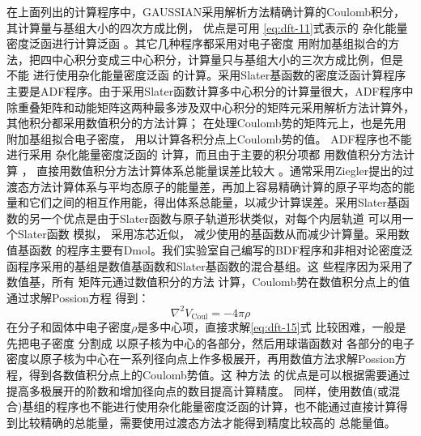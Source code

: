 在上面列出的计算程序中，GAUSSIAN采用解析方法精确计算的Coulomb积分，其计算量与基组大小的四次方成比例，%
{优点是可}用%
\eqref{eq:dft-11}式表示的%
{杂化能量密度泛函进行计算}泛函%
。其它几种程序都采用对电子密度%
用附加基组拟合{的方法}，把四中心积分变成三中心积分，计算量只与基组大小的三次方成比例，但是%
不能%
{进行}{使用杂化能量密度}泛函%
{的计算}。采用Slater基函数的密度泛函计算程序主要是ADF程序\cite{ADF-UG_1995}{。}由于采用Slater函数计算多中心积分的计算量很大，ADF程序中除重叠矩阵和动能矩阵这两种最多涉及双中心积分的矩阵元采用解析方法计算外，其他积分都采用数值积分的方法计算{；}%
在处理Coulomb势的矩阵元上，也是先用%
附加基组拟合电子密度，%
{用以}计算各积分点上Coulomb势的值。%
{ADF程序}也不能{进行}采用%
{杂化能量密度}泛函的%
{计算}，而且由于主要的积分项都%
用数值积分方法计算%
，%
直接用数值积分方法计算体系总能量{误差}比较大%
{。}通常采用Ziegler\cite{TCA46-1_1977}提出的过渡态方法计算体系与{平}均态原子的能量差{，再加上容易精确计算的原子平均态的能量和它们之间的相互作用能，得出体系总能量，}以减少计算误差。采用Slater基函数的另一个优点是由于Slater函数与原子轨道形状类似，对每个内层轨道%
{可以}用一个Slater函数%
模拟，%
采用冻芯近似，%
{减少使用的基函数从而}减少计算量。采用数值基函数%
的程序主要有Dmol\cite{JCP92-508_1990}{。}我们实验室自己编写的BDF程序\cite{TCA96-75_1997}和非相对论密度泛函程序\cite{PKUAS32-172_1996}采用的基组是数值基函数和Slater基函数的混合基{组}。这%
{些程序}因为采用了数值基，所有%
矩阵元通过数值积分的方法%
{计算}，Coulomb势在数值积分点上的值%
通过求解Possion方程%
得到：
\begin{equation} \label{eq:dft-15}
  \nabla^2V_{\mathrm{Coul}}=-4\pi\rho
\end{equation}
{在分子和固体中}电子密度$\rho$是多中心项，直接求解\eqref{eq:dft-15}式%
比较困难，一般是%
{先}把电子密度%
分割成%
{以原子核为中心的各}部分，然后用球谐函数对%
{各部分}的电子密度{以原子核为中心在一系列径向点上}作多极展开，再用数值方法求解Possion方程，{得到各数值积分点上的Coulomb势值。}这%
{种}方法%
{的优点是可以根据需要通过提高多极展开的阶数和增加径向点的数目提高计算精度。}%
{同样，使用数值(或混合)基组的程序也不能进行使用杂化能量密度泛函的计算，}也不能通过直接计算得到比较精确的总能量，需要使用过渡态方法才能得到精度比较高的%
{总}能量值。%

